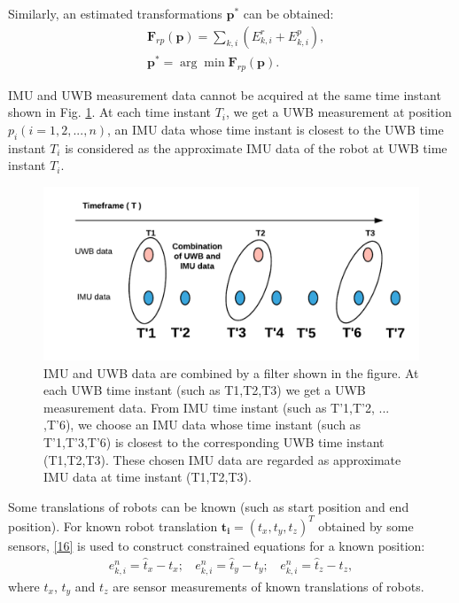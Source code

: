 \documentclass[journal]{IEEEtran}
\begin{document}
Similarly, an estimated transformations $\mathbf{p^*}$ can be obtained:
\begin{subequations}\label{c2}
\begin{align}
&\mathbf F_{rp}(\mathbf p) = \sum_{k,i}(E_{k,i}^{r} + E_{k,i}^{p}), \\
& \mathbf {p^*} = {\arg}\min \mathbf F_{rp}(\mathbf p).
\end{align}
\end{subequations}

IMU  and  UWB  measurement  data  cannot  be  acquired at  the  same  time instant shown in 
Fig. \ref{fig3}. At each time instant $T_i$, we get a UWB measurement at position $p_i (i=1,2,...,n)$, an IMU data whose time instant is closest to the UWB time instant $T_i$ is considered as the  approximate IMU data of the robot at UWB time instant $T_i$. 

\begin{figure}[!t]
\centering
\includegraphics[width=1\linewidth]{pic/filter.pdf}
\caption{IMU and UWB data are combined by a filter shown in the figure. At each UWB time instant (such as T1,T2,T3) we get a UWB measurement data. From IMU time instant (such as T'1,T'2, ... ,T'6), we choose an IMU data whose time instant (such as T'1,T'3,T'6) is closest to the  corresponding UWB time instant (T1,T2,T3). These chosen IMU data are regarded as approximate IMU data at time instant (T1,T2,T3).}
\label{fig3}
\end{figure}

Some translations of robots can be known (such as start position and end position). For known robot translation $\mathbf{ t_i }= (t_{x},t_{y},t_{z})^{T}$ obtained by some sensors,  
\eqref{16} is used to construct constrained equations for a known position:
\begin{equation}\label{33}
\begin{array}{c}
e_{k,i}^{n} = \hat t_{x} -  t_{x};\ \
 \ \ e_{k,i}^{n} = \hat t_{y} -  t_{y};\ \
 \ \ e_{k,i}^{n} = \hat t_{z} -  t_{z},
\end{array}
\end{equation}
where $t_{x}$, $t_{y}$ and $t_{z}$ are sensor measurements of known translations of robots.
\end{document}
